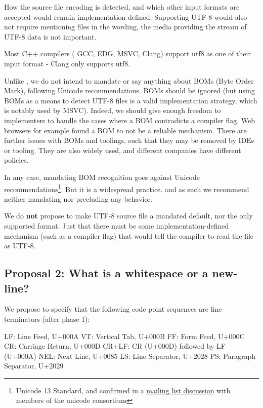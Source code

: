 \documentclass{wg21}
\begin{document}
How the source file encoding is detected, and which other input formats are accepted would remain implementation-defined.
Supporting UTF-8 would also not require mentioning files in the wording, the media providing the stream of UTF-8 data is not important.

Most C++ compilers ( GCC, EDG, MSVC, Clang) support utf8 as one of their input format - Clang only supports utf8.

Unlike , we do not intend to mandate or say anything about BOMs (Byte Order Mark), following Unicode recommendations.
BOMs should be ignored (but using BOMs as a means to detect UTF-8 files is a valid implementation strategy, which is notably used by MSVC).
Indeed, we should give enough freedom to implementers to handle the cases where a BOM contradicts a compiler flag. 
Web browsers for example found a BOM to not be a reliable mechanism.
There are further issues with BOMs and toolings, such that they may be removed by IDEs or tooling.
They are also widely used, and different companies have different policies.

In any case, mandating BOM recognition goes against Unicode recommendations\footnote{Unicode 13 Standard, and confirmed in a \href{https://corp.unicode.org/mailman/private/unicode/2020-June/008716.html}{mailing list discussion} with members of the unicode consortium}. But it is a widespread practice. and as such
we recommend neither mandating nor precluding any behavior.

We do \textbf{not} propose to make UTF-8 source file a mandated default, nor the only supported format. Just that there must be
some implementation-defined mechanism (such as a compiler flag) that would tell the compiler to read the file as UTF-8.


\subsection{Proposal 2: What is a whitespace or a new-line?}

We propose to specify that the following code point sequences are line-terminators (after phase 1):

\begin{codeblock}
LF:    Line Feed, U+000A
VT:    Vertical Tab, U+000B
FF:    Form Feed, U+000C
CR:    Carriage Return, U+000D
CR+LF: CR (U+000D) followed by LF (U+000A)
NEL:   Next Line, U+0085
LS:    Line Separator, U+2028
PS:    Paragraph Separator, U+2029
\end{codeblock}
\end{document}
